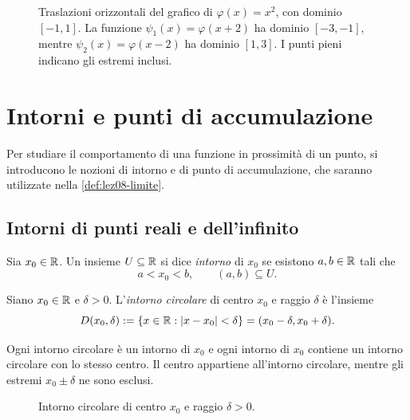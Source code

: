 \begin{figure}[htbp]
  \centering
  
  \caption{Traslazioni orizzontali del grafico
  di \(\varphi(x)=x^2\), con dominio \([-1,1]\).
  La funzione \(\psi_1(x)=\varphi(x+2)\) ha dominio
  \([-3,-1]\), mentre \(\psi_2(x)=\varphi(x-2)\)
  ha dominio \([1,3]\). I punti pieni indicano
  gli estremi inclusi.}
  \label{fig:lez07-orizzontali}
\end{figure}


\section{Intorni e punti di accumulazione}
\label{sec:lez07-intorni-accumulazione}

Per studiare il comportamento di una funzione
in prossimità di un punto, si introducono le
nozioni di intorno e di punto di accumulazione,
che saranno utilizzate nella \cref{def:lez08-limite}.

\subsection{Intorni di punti reali e dell'infinito}
\label{sec:lez07-intorni}

\begin{definition}
\label{def:lez07-intorno-generale}
Sia \(x_0\in\mathbb{R}\). Un insieme \(U\subseteq\mathbb{R}\)
si dice \emph{intorno} di \(x_0\) se esistono
\(a,b\in\mathbb{R}\) tali che
\[
  a<x_0<b,
  \qquad
  (a,b)\subseteq U.
\]
\end{definition}

\begin{definition}
\label{def:lez07-intorno}
Siano \(x_0\in\mathbb{R}\) e \(\delta>0\).
L'\emph{intorno circolare} di centro \(x_0\)
e raggio \(\delta\) è l'insieme
\[
  D(x_0,\delta)
  :=\{x\in\mathbb{R}:|x-x_0|<\delta\}
  =(x_0-\delta,x_0+\delta).
\]
\end{definition}

Ogni intorno circolare è un intorno di \(x_0\)
e ogni intorno di \(x_0\) contiene un intorno
circolare con lo stesso centro. Il centro appartiene
all'intorno circolare, mentre gli estremi
\(x_0\pm\delta\) ne sono esclusi.

\begin{figure}[htbp]
  \centering
  
  \caption{Intorno circolare di centro \(x_0\)
  e raggio \(\delta>0\).}
  \label{fig:lez07-intorno}
\end{figure}

